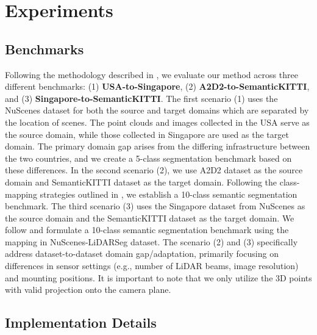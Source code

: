 

\section{Experiments}

\tableAbl
\subsection{Benchmarks}
Following the methodology described in \cite{jaritz2020xmuda, simons2023summit}, we evaluate our method across three different benchmarks: (1) \textbf{USA-to-Singapore}, (2) \textbf{A2D2-to-SemanticKITTI}, and (3) \textbf{Singapore-to-SemanticKITTI}. The first scenario (1) uses the NuScenes dataset \cite{caesar2020nuscenes} for both the source and target domains which are separated by the location of scenes. The point clouds and images collected in the USA serve as the source domain, while those collected in Singapore are used as the target domain. The primary domain gap arises from the differing infrastructure between the two countries, and we create a 5-class segmentation benchmark based on these differences. In the second scenario (2), we use A2D2 dataset \cite{geyer2020a2d2} as the source domain and SemanticKITTI \cite{behley2019semantickitti} dataset as the target domain. Following the class-mapping strategies outlined in \cite{jaritz2020xmuda, simons2023summit}, we establish a 10-class semantic segmentation benchmark. The third scenario (3) uses the Singapore dataset from NuScenes as the source domain and the SemanticKITTI dataset as the target domain. We follow \cite{simons2023summit} and formulate a 10-class semantic segmentation benchmark using the mapping in NuScenes-LiDARSeg dataset. The scenario (2) and (3) specifically address dataset-to-dataset domain gap/adaptation, primarily focusing on differences in sensor settings (e.g., number of LiDAR beams, image resolution) and mounting positions. It is important to note that we only utilize the 3D points with valid projection onto the camera plane.

\figVis

\subsection{Implementation Details}


